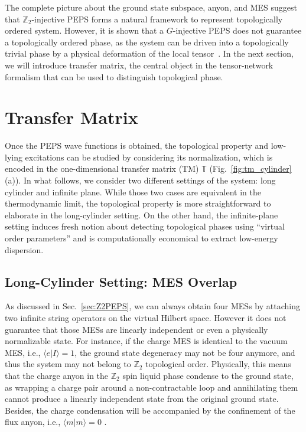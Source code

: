 \documentclass{ntuthesis}
\newcommand{\citep}{\cite}
\begin{document}
The complete picture about the ground state subspace, anyon, and MES suggest that $\mathbb{Z}_2$-injective PEPS forms a natural framework to represent topologically ordered system. However, it is shown that a $G$-injective PEPS does not guarantee a topologically ordered phase, as the system can be driven into a topologically trivial phase by a physical deformation of the local tensor~\cite{Norbert_Schuch_2013,Haegeman_2015, 2017_anyon_condensates, 2017_Z4_anyon, 2017_sym_induced,2018_Chen_Boson_condensation, Zhang_2019}. 
%
In the next section, we will introduce transfer matrix, the central object in the tensor-network formalism that can be used to distinguish topological phase.



\section{Transfer Matrix}
Once the PEPS wave functions is obtained, the topological property and low-lying excitations can be studied by considering its normalization, which is encoded in the one-dimensional transfer matrix (TM) $\mathbb{T}$ (Fig.~\ref{fig:tm_cylinder}(a)).  
%
In what follows, we consider two different settings of the system: long cylinder and infinite plane. While those two cases are equivalent in the thermodynamic limit, the topological property is more straightforward to elaborate in the long-cylinder setting. On the other hand, the infinite-plane setting induces fresh notion about detecting topological phases using ``virtual order parameters'' and is computationally economical to extract low-energy dispersion.

\subsection{Long-Cylinder Setting: MES Overlap}
\label{subsec:long-cylinder}


As discussed in Sec.~\ref{sec:Z2PEPS}, we can always obtain four MESs by attaching two infinite string operators on the virtual Hilbert space. However it does not guarantee that those MESs are linearly independent or even a physically normalizable state. For instance, if the charge MES is identical to the vacuum MES, i.e., $\langle e| I \rangle = 1$, the ground state degeneracy may not be four anymore, and thus the system may not belong to $\mathbb{Z}_2$ topological order. Physically, this means that the charge anyon in the $\mathbb{Z}_2$ spin liquid phase condense to the ground state, as wrapping a charge pair around a non-contractable loop and annihilating them cannot produce a linearly independent state from the original ground state. Besides, the charge condensation will be accompanied by the confinement of the flux anyon, i.e., $\langle m | m \rangle = 0$ \citep{2009-PRB-Condensate-induced, 2017_anyon_condensates}.
%
\end{document}
